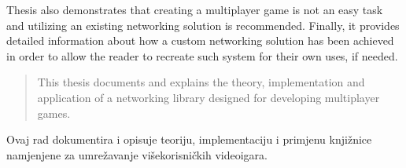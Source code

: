 \documentclass[times, utf8, diplomski]{fer}
\begin{document}
Thesis also demonstrates that creating a multiplayer game is not an easy task and utilizing an existing networking solution is recommended. Finally, it provides detailed information about how a custom networking solution has been achieved in order to allow the reader to recreate such system for their own uses, if needed.



\clearpage

\begin{abstract}
This thesis documents and explains the theory, implementation and application of a networking library designed for developing multiplayer games.
	
\end{abstract}



\begin{sazetak}
Ovaj rad dokumentira i opisuje teoriju, implementaciju i primjenu knjižnice namjenjene za umrežavanje višekorisničkih videoigara.

\end{sazetak}
\end{document}
